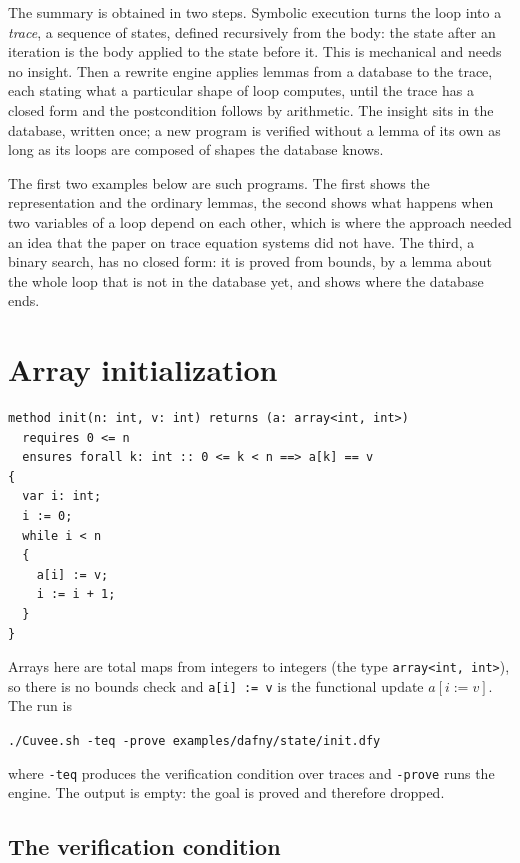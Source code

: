 \documentclass[11pt,a4paper]{article}
\begin{document}
The summary is obtained in two steps. Symbolic execution turns the loop into a \emph{trace}, a sequence of states,
defined recursively from the body: the state after an iteration is the body applied to the state before it. This is
mechanical and needs no insight. Then a rewrite engine applies lemmas from a database to the trace, each stating what a
particular shape of loop computes, until the trace has a closed form and the postcondition follows by arithmetic.
The insight sits in the database, written once; a new program is verified without a lemma of its own as long as its
loops are composed of shapes the database knows.

The first two examples below are such programs. The first shows the representation and the ordinary lemmas, the
second shows what happens when two variables of a loop depend on each other, which is where the approach needed
an idea that the paper on trace equation systems did not have. The third, a binary search, has no closed form: it
is proved from bounds, by a lemma about the whole loop that is not in the database yet, and shows where the database
ends.

\section{Array initialization}

\begin{lstlisting}
method init(n: int, v: int) returns (a: array<int, int>)
  requires 0 <= n
  ensures forall k: int :: 0 <= k < n ==> a[k] == v
{
  var i: int;
  i := 0;
  while i < n
  {
    a[i] := v;
    i := i + 1;
  }
}
\end{lstlisting}

Arrays here are total maps from integers to integers (the type \lstinline|array<int, int>|), so there is no bounds
check and \lstinline|a[i] := v| is the functional update $a[i := v]$. The run is
\begin{center}
\texttt{./Cuvee.sh -teq -prove examples/dafny/state/init.dfy}
\end{center}
where \texttt{-teq} produces the verification condition over traces and \texttt{-prove} runs the engine. The
output is empty: the goal is proved and therefore dropped.

\subsection{The verification condition}
\end{document}
